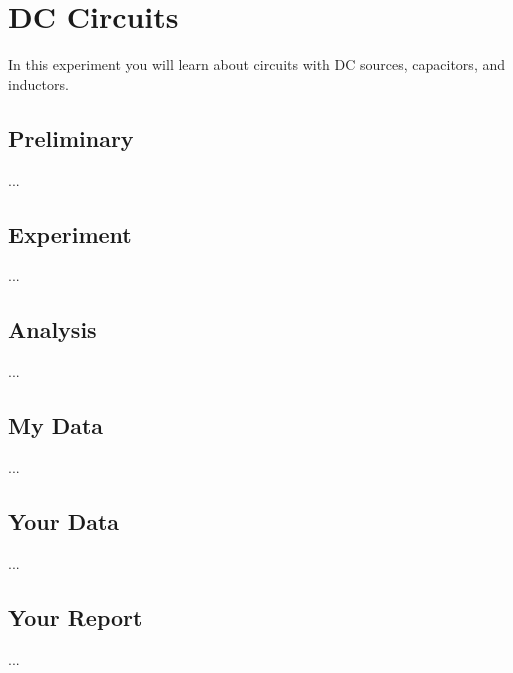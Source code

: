 \setcounter{chapter}{4}
\chapter{DC Circuits}
In this experiment you will learn about circuits with DC sources, capacitors, and inductors.
\section{Preliminary}
...
\section{Experiment}
...
\section{Analysis}
...
\section{My Data}
...
\section{Your Data}
...
\newpage
\section{Your Report}
...
\newpage
